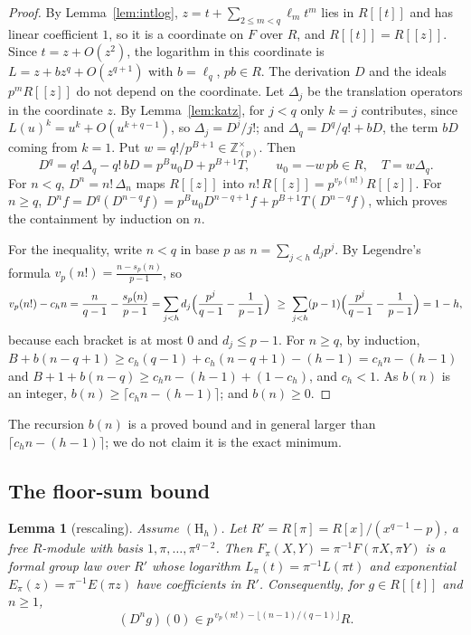 \documentclass[11pt]{amsart}
\newtheorem{lemma}[thm]{Lemma}
\theoremstyle{definition}
\theoremstyle{remark}
\newcommand{\Z}{\mathbb Z}
\newcommand{\vp}{v_p}
\begin{document}
\begin{proof}
By Lemma~\ref{lem:intlog}, $z=t+\sum_{2\le m<q}\ell_mt^m$ lies in $R[[t]]$ and has linear coefficient $1$, so it is a coordinate on $F$ over $R$, and $R[[t]]=R[[z]]$. Since $t=z+O(z^2)$, the logarithm in this coordinate is $L=z+bz^q+O(z^{q+1})$ with $b=\ell_q$, $pb\in R$. The derivation $D$ and the ideals $p^mR[[z]]$ do not depend on the coordinate. Let $\Delta_j$ be the translation operators in the coordinate $z$. By Lemma~\ref{lem:katz}, for $j<q$ only $k=j$ contributes, since $L(u)^k=u^k+O(u^{k+q-1})$, so $\Delta_j=D^j/j!$; and $\Delta_q=D^q/q!+bD$, the term $bD$ coming from $k=1$. Put $w=q!/p^{B+1}\in\Z_{(p)}^\times$. Then
\begin{equation}\label{eq:keyop}
 D^q=q!\,\Delta_q-q!\,bD=p^Bu_0D+p^{B+1}T,\qquad u_0=-w\,pb\in R,\quad T=w\Delta_q .
\end{equation}
For $n<q$, $D^n=n!\,\Delta_n$ maps $R[[z]]$ into $n!\,R[[z]]=p^{\vp(n!)}R[[z]]$. For $n\ge q$, $D^nf=D^q(D^{n-q}f)=p^Bu_0D^{n-q+1}f+p^{B+1}T(D^{n-q}f)$, which proves the containment by induction on $n$.

For the inequality, write $n<q$ in base $p$ as $n=\sum_{j<h}d_jp^j$. By Legendre's formula $\vp(n!)=\frac{n-s_p(n)}{p-1}$, so
\[
 \vp(n!)-c_hn=\frac{n}{q-1}-\frac{s_p(n)}{p-1}=\sum_{j<h}d_j\Bigl(\frac{p^j}{q-1}-\frac1{p-1}\Bigr)\ \ge\ \sum_{j<h}(p-1)\Bigl(\frac{p^j}{q-1}-\frac1{p-1}\Bigr)=1-h,
\]
because each bracket is at most $0$ and $d_j\le p-1$. For $n\ge q$, by induction, $B+b(n-q+1)\ge c_h(q-1)+c_h(n-q+1)-(h-1)=c_hn-(h-1)$ and $B+1+b(n-q)\ge c_hn-(h-1)+(1-c_h)$, and $c_h<1$. As $b(n)$ is an integer, $b(n)\ge\lceil c_hn-(h-1)\rceil$; and $b(n)\ge0$.
\end{proof}

The recursion $b(n)$ is a proved bound and in general larger than $\lceil c_hn-(h-1)\rceil$; we do not claim it is the exact minimum.

\subsection{The floor-sum bound}

\begin{lemma}[rescaling]\label{lem:rescale}
Assume $(\mathrm H_h)$. Let $R'=R[\pi]=R[x]/(x^{q-1}-p)$, a free $R$-module with basis $1,\pi,\dots,\pi^{q-2}$. Then $F_\pi(X,Y)=\pi^{-1}F(\pi X,\pi Y)$ is a formal group law over $R'$ whose logarithm $L_\pi(t)=\pi^{-1}L(\pi t)$ and exponential $E_\pi(z)=\pi^{-1}E(\pi z)$ have coefficients in $R'$. Consequently, for $g\in R[[t]]$ and $n\ge1$,
\[
 (D^ng)(0)\in p^{\,\vp(n!)-\lfloor (n-1)/(q-1)\rfloor}R .
\]
\end{lemma}
\end{document}

